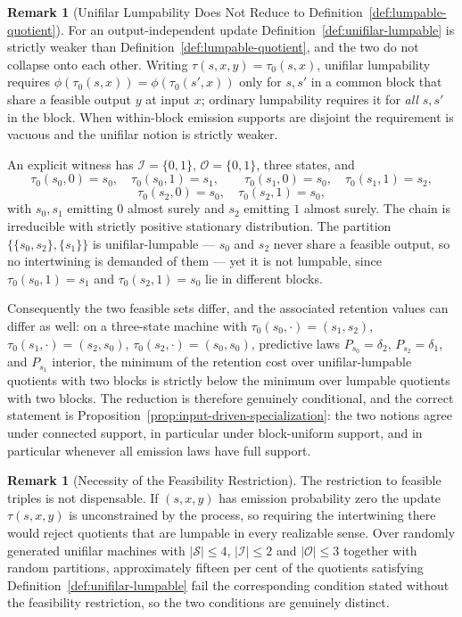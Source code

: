 \documentclass[12pt]{article}
\theoremstyle{definition}
\newtheorem{remark}[theorem]{Remark}
\begin{document}
\begin{remark}[Unifilar Lumpability Does Not Reduce to
Definition~\ref{def:lumpable-quotient}]
\label{rem:unifilar-support-not-automatic}
For an output-independent update Definition~\ref{def:unifilar-lumpable} is
strictly weaker than Definition~\ref{def:lumpable-quotient}, and the two do not
collapse onto each other.  Writing
$\tau(s,x,y)=\tau_0(s,x)$, unifilar lumpability requires
$\phi(\tau_0(s,x))=\phi(\tau_0(s',x))$ only for $s,s'$ in a common block that
share a feasible output $y$ at input $x$; ordinary lumpability requires it for
\emph{all} $s,s'$ in the block.  When within-block emission supports are
disjoint the requirement is vacuous and the unifilar notion is strictly weaker.

An explicit witness has $\mathcal I=\{0,1\}$, $\mathcal O=\{0,1\}$, three
states, and
\[
\tau_0(s_0,0)=s_0,\quad \tau_0(s_0,1)=s_1,\qquad
\tau_0(s_1,0)=s_0,\quad \tau_0(s_1,1)=s_2,
\]
\[
\tau_0(s_2,0)=s_0,\quad \tau_0(s_2,1)=s_0,
\]
with $s_0,s_1$ emitting $0$ almost surely and $s_2$ emitting $1$ almost surely.
The chain is irreducible with strictly positive stationary distribution.  The
partition $\{\{s_0,s_2\},\{s_1\}\}$ is unifilar-lumpable --- $s_0$ and $s_2$
never share a feasible output, so no intertwining is demanded of them --- yet
it is not lumpable, since $\tau_0(s_0,1)=s_1$ and $\tau_0(s_2,1)=s_0$ lie in
different blocks.

Consequently the two feasible sets differ, and the associated retention values
can differ as well: on a three-state machine with
$\tau_0(s_0,\cdot)=(s_1,s_2)$, $\tau_0(s_1,\cdot)=(s_2,s_0)$,
$\tau_0(s_2,\cdot)=(s_0,s_0)$, predictive laws
$P_{s_0}=\delta_2$, $P_{s_2}=\delta_1$, and $P_{s_1}$ interior, the minimum of
the retention cost over unifilar-lumpable quotients with two blocks is strictly
below the minimum over lumpable quotients with two blocks.  The reduction is
therefore genuinely conditional, and the correct statement is
Proposition~\ref{prop:input-driven-specialization}: the two notions agree under
connected support, in particular under block-uniform support, and in particular
whenever all emission laws have full support.
\end{remark}

\begin{remark}[Necessity of the Feasibility Restriction]
\label{rem:unifilar-feasibility}
The restriction to feasible triples is not dispensable.  If
$(s,x,y)$ has emission probability zero the update $\tau(s,x,y)$ is
unconstrained by the process, so requiring the intertwining there would reject
quotients that are lumpable in every realizable sense.  Over randomly generated unifilar machines with $|\mathcal S|\le4$,
$|\mathcal I|\le2$ and $|\mathcal O|\le3$ together with random partitions,
approximately fifteen per cent of the quotients satisfying
Definition~\ref{def:unifilar-lumpable} fail the corresponding condition stated
without the feasibility restriction, so the two conditions are genuinely
distinct.
\end{remark}
\end{document}

